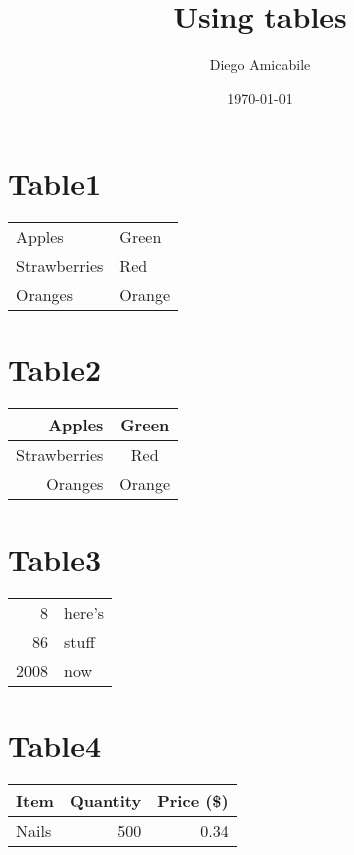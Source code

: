 \documentclass[a4paper,12pt]{article}
\begin{document}
\title{Using tables}
\author{Diego Amicabile}
\date{\today}
\maketitle

\section{Table1}
\begin{tabular}{|l|l|}
Apples & Green \\
Strawberries & Red \\
Oranges & Orange \\
\end{tabular}

\section{Table2}
\begin{tabular}{rc}
Apples & Green \\
\hline
Strawberries & Red \\
\cline{1-1}
Oranges & Orange \\
\end{tabular}

\section{Table3}
\begin{tabular}{|r|l|}
\hline
8 & here’s \\
\cline{2-2}
86 & stuff \\
\hline \hline
2008 & now \\
\hline
\end{tabular}

\section{Table4}
\begin{tabular}{|l|r|r|}
Item & Quantity & Price (\$) \\
\hline
Nails & 500 & 0.34 \\
\end{tabular}
\end{document}
